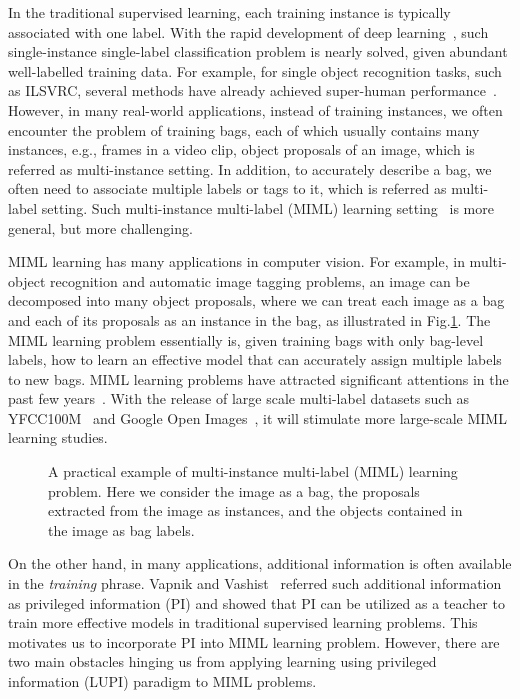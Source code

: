 \documentclass[10pt,twocolumn,letterpaper]{article}
\begin{document}
In the traditional supervised learning, each training instance is
typically associated with one label. With the rapid development of
deep learning~\cite{Alex2012}, such single-instance single-label
classification problem is nearly solved, given abundant
well-labelled training data. For example, for single object
recognition tasks, such as ILSVRC, several methods have already
achieved super-human performance~\cite{He2015,He2016,Ioffe2015}.
However, in many real-world applications, instead of training
instances, we often encounter the problem of training bags, each
of which usually contains many instances, e.g., frames in a video
clip, object proposals of an image, which is referred as
multi-instance setting. In addition, to accurately describe a bag,
we often need to associate multiple labels or tags to it, which is
referred as multi-label setting. Such multi-instance multi-label
(MIML) learning setting~\cite{Zhou2012} is more general, but more
challenging.

MIML learning has many applications in computer vision. For
example, in multi-object recognition and automatic image tagging
problems, an image can be decomposed into many object proposals,
where we can treat each image as a bag and each of its proposals
as an instance in the bag, as illustrated in
Fig.\ref{example-miml}. The MIML learning problem essentially is,
given training bags with only bag-level labels, how to learn an
effective model that can accurately assign multiple labels to new
bags. MIML learning problems have attracted significant attentions
in the past few
years~\cite{Simonyan2014,Yang2016a,Oquab2014,Bilen2016}. With the
release of large scale multi-label datasets such as
YFCC100M~\cite{YFCC100M} and Google Open Images~\cite{openimages},
it will stimulate more large-scale MIML learning studies.

\begin{figure}
	\caption{A practical example of multi-instance multi-label (MIML) learning problem. Here we consider the image as a bag, the proposals extracted from the image as instances, and the objects contained in the image as bag labels.}
	\label{example-miml}
\end{figure}

On the other hand, in many applications, additional information is
often available in the \emph{training} phrase. Vapnik and
Vashist~\cite{Vapnik2009} referred such additional information as
privileged information (PI) and showed that PI can be utilized as
a teacher to train more effective models in traditional supervised
learning problems. This motivates us to incorporate PI into MIML
learning problem. However, there are two main obstacles hinging us
from applying learning using privileged information (LUPI)
paradigm to MIML problems.
\end{document}
